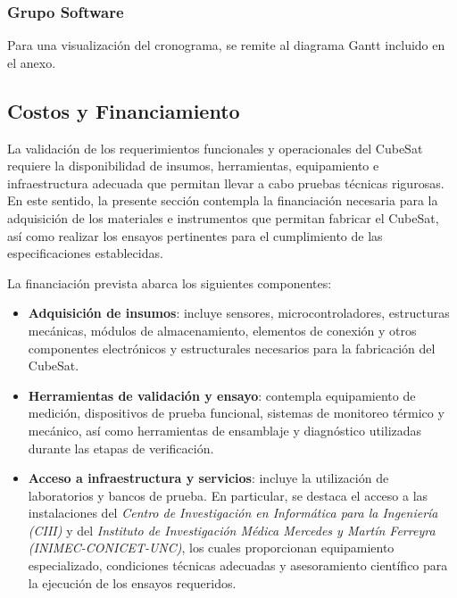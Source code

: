     \subsubsection{Grupo Software}
    Para una visualización del cronograma, se remite al diagrama Gantt incluido en el anexo.
  \subsection{Costos y Financiamiento}

  La validación de los requerimientos funcionales y operacionales del CubeSat requiere la disponibilidad de insumos,
  herramientas, equipamiento e infraestructura adecuada que permitan llevar a cabo pruebas técnicas rigurosas. En este
  sentido, la presente sección contempla la financiación necesaria para la adquisición de los materiales e instrumentos
  que permitan fabricar el CubeSat, así como realizar los ensayos pertinentes para el cumplimiento de las
  especificaciones establecidas.

  La financiación prevista abarca los siguientes componentes:

  \begin{itemize}
    \item \textbf{Adquisición de insumos}: incluye sensores, microcontroladores, estructuras mecánicas, módulos de
      almacenamiento, elementos de conexión y otros componentes electrónicos y estructurales necesarios para la
      fabricación del CubeSat.

    \item \textbf{Herramientas de validación y ensayo}: contempla equipamiento de medición, dispositivos de prueba
      funcional, sistemas de monitoreo térmico y mecánico, así como herramientas de ensamblaje y diagnóstico utilizadas
      durante las etapas de verificación.

    \item \textbf{Acceso a infraestructura y servicios}: incluye la utilización de laboratorios y bancos de prueba. En
      particular, se destaca el acceso a las instalaciones del \textit{Centro de Investigación en Informática para la
      Ingeniería (CIII)} y del \textit{Instituto de Investigación Médica Mercedes y Martín Ferreyra
      (INIMEC-CONICET-UNC)}, los cuales proporcionan equipamiento especializado, condiciones técnicas adecuadas y
      asesoramiento científico para la ejecución de los ensayos requeridos.

  \end{itemize}

